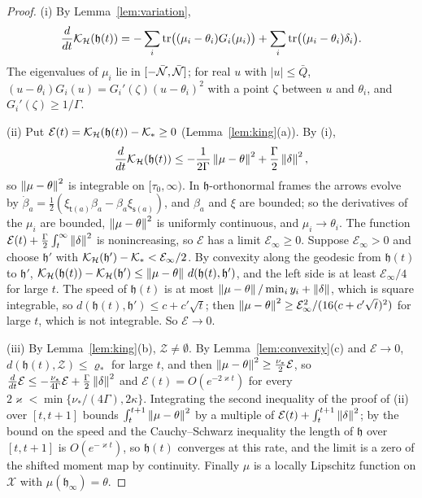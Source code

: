 \begin{proof}
(i) By Lemma~\ref{lem:variation},
\[
 \frac d{dt}\mathcal K_{\mathcal H}(\mathfrak h(t))=-\sum_i\operatorname{tr}\bigl((\mu_i-\theta_i)G_i(\mu_i)\bigr)
 +\sum_i\operatorname{tr}\bigl((\mu_i-\theta_i)\delta_i\bigr).
\]
The eigenvalues of $\mu_i$ lie in $[-\bar{\mathcal N},\bar{\mathcal N}]$; for real $u$ with
$|u|\leq\bar Q$, $(u-\theta_i)G_i(u)=G_i'(\zeta)(u-\theta_i)^2$ with a point
$\zeta$ between $u$ and $\theta_i$, and $G_i'(\zeta)\geq1/\Gamma$.

(ii) Put $\mathcal E(t)=\mathcal K_{\mathcal H}(\mathfrak h(t))-\mathcal K_*\geq0$
(Lemma~\ref{lem:king}(a)). By (i),
\[
 \frac d{dt}\mathcal K_{\mathcal H}(\mathfrak h(t))\leq-\frac1{2\Gamma}\left\lVert\mu-\theta\right\rVert^2+\frac\Gamma2\left\lVert\delta\right\rVert^2 ,
\]
so $\left\lVert\mu-\theta\right\rVert^2$ is integrable on $[\tau_0,\infty)$. In
$\mathfrak h$-orthonormal frames the arrows evolve by
$\dot\beta_a=\frac12(\xi_{\mathsf t(a)}\beta_a-\beta_a\xi_{\mathsf s(a)})$, and
$\beta_a$ and $\xi$ are bounded; so the derivatives of the $\mu_i$ are
bounded, $\left\lVert\mu-\theta\right\rVert^2$ is uniformly continuous, and
$\mu_i\to\theta_i$. The function
$\mathcal E(t)+\frac\Gamma2\int_t^\infty\left\lVert\delta\right\rVert^2$ is nonincreasing, so
$\mathcal E$ has a limit $\mathcal E_\infty\geq0$. Suppose
$\mathcal E_\infty>0$ and choose $\mathfrak h'$ with
$\mathcal K_{\mathcal H}(\mathfrak h')-\mathcal K_*<\mathcal E_\infty/2$. By convexity along
the geodesic from $\mathfrak h(t)$ to $\mathfrak h'$,
$\mathcal K_{\mathcal H}(\mathfrak h(t))-\mathcal K_{\mathcal H}(\mathfrak h')\leq\left\lVert\mu-\theta\right\rVert\,d(\mathfrak h(t),\mathfrak h')$,
and the left side is at least $\mathcal E_\infty/4$ for large $t$. The speed
of $\mathfrak h(t)$ is at most $\left\lVert\mu-\theta\right\rVert/\min_iy_i+\left\lVert\delta\right\rVert$,
which is square integrable, so
$d(\mathfrak h(t),\mathfrak h')\leq c+c'\sqrt t$; then
$\left\lVert\mu-\theta\right\rVert^2\geq\mathcal E_\infty^2/(16(c+c'\sqrt t)^2)$ for large
$t$, which is not integrable. So $\mathcal E\to0$.

(iii) By Lemma~\ref{lem:king}(b), $\mathcal Z\neq\emptyset$. By
Lemma~\ref{lem:convexity}(c) and $\mathcal E\to0$,
$d(\mathfrak h(t),\mathcal Z)\leq\varrho_*$ for large $t$, and then
$\left\lVert\mu-\theta\right\rVert^2\geq\frac{\nu_*}2\mathcal E$, so
$\frac d{dt}\mathcal E\leq-\frac{\nu_*}{4\Gamma}\mathcal E+\frac\Gamma2\left\lVert\delta\right\rVert^2$
and $\mathcal E(t)=O(e^{-2\varkappa t})$ for every
$2\varkappa<\min\{\nu_*/(4\Gamma),2\kappa\}$. Integrating the second
inequality of the proof of (ii) over $[t,t+1]$ bounds
$\int_t^{t+1}\left\lVert\mu-\theta\right\rVert^2$ by a multiple of
$\mathcal E(t)+\int_t^{t+1}\left\lVert\delta\right\rVert^2$; by the bound on the speed and the
Cauchy--Schwarz inequality the length of $\mathfrak h$ over $[t,t+1]$ is
$O(e^{-\varkappa t})$, so $\mathfrak h(t)$ converges at this rate, and the
limit is a zero of the shifted moment map by continuity. Finally $\mu$ is a
locally Lipschitz function on $\mathcal X$ with $\mu(\mathfrak h_\infty)=\theta$.
\end{proof}

